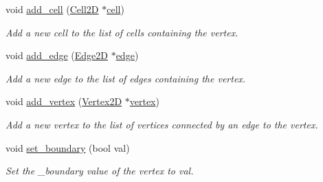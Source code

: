 \begin{DoxyCompactItemize}
\mbox{\label{classHArDCore2D_1_1Vertex2D_ae2b51139ae320115c0a732cb68dd5d91}} 
void \hyperlink{classHArDCore2D_1_1Vertex2D_ae2b51139ae320115c0a732cb68dd5d91}{add\+\_\+cell} (\hyperlink{classHArDCore2D_1_1Cell2D}{Cell2D} $\ast$\hyperlink{classHArDCore2D_1_1Vertex2D_ad5eb7914636eb9937f84370c6030aed9}{cell})
\begin{DoxyCompactList}\small\item\em Add a new cell to the list of cells containing the vertex. \end{DoxyCompactList}\item 
\mbox{\label{classHArDCore2D_1_1Vertex2D_a99d9e89fc5a01f960ca48179137dbd2f}} 
void \hyperlink{classHArDCore2D_1_1Vertex2D_a99d9e89fc5a01f960ca48179137dbd2f}{add\+\_\+edge} (\hyperlink{classHArDCore2D_1_1Edge2D}{Edge2D} $\ast$\hyperlink{classHArDCore2D_1_1Vertex2D_afebfae577ee499d5309ff6a3981279de}{edge})
\begin{DoxyCompactList}\small\item\em Add a new edge to the list of edges containing the vertex. \end{DoxyCompactList}\item 
\mbox{\label{classHArDCore2D_1_1Vertex2D_a44556af3aa22a09d2442fb87833085af}} 
void \hyperlink{classHArDCore2D_1_1Vertex2D_a44556af3aa22a09d2442fb87833085af}{add\+\_\+vertex} (\hyperlink{classHArDCore2D_1_1Vertex2D}{Vertex2D} $\ast$\hyperlink{classHArDCore2D_1_1Vertex2D_a2094c42a5fe6dc9fa3b91cb90746eeb9}{vertex})
\begin{DoxyCompactList}\small\item\em Add a new vertex to the list of vertices connected by an edge to the vertex. \end{DoxyCompactList}\item 
\mbox{\label{classHArDCore2D_1_1Vertex2D_a605706aa9e02bfc556a99c72eaf3e454}} 
void \hyperlink{classHArDCore2D_1_1Vertex2D_a605706aa9e02bfc556a99c72eaf3e454}{set\+\_\+boundary} (bool val)
\begin{DoxyCompactList}\small\item\em Set the \+\_\+boundary value of the vertex to val. \end{DoxyCompactList}\end{DoxyCompactItemize}


